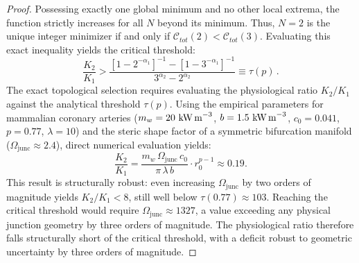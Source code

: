 \documentclass[11pt,a4paper]{article}
\theoremstyle{remark}
\begin{document}
\begin{proof}
Possessing exactly one global minimum and no other local extrema, the function
strictly increases for all $N$ beyond its minimum. Thus, $N=2$ is the unique
integer minimizer if and only if $\mathcal{C}_{tot}(2) < \mathcal{C}_{tot}(3)$.
Evaluating this exact inequality yields the critical threshold:
\[ \frac{K_2}{K_1} > \frac{ \left[ 1 - 2^{-\alpha_1} \right]^{-1} - \left[ 1 - 3^{-\alpha_1} \right]^{-1} }{ 3^{\alpha_2} - 2^{\alpha_2} } \equiv \tau(p) \,. \]
The exact topological selection requires evaluating the physiological
ratio $K_2/K_1$ against the analytical threshold $\tau(p)$. Using
the empirical parameters for mammalian coronary arteries
($m_w = 20~\text{kW\,m}^{-3}$, $b = 1.5~\text{kW\,m}^{-3}$,
$c_0 = 0.041$, $p = 0.77$, $\lambda = 10$) and the steric shape factor
of a symmetric bifurcation manifold ($\Omega_{\mathrm{junc}} \approx
2.4$), direct numerical evaluation yields:
\[
  \frac{K_2}{K_1}
  = \frac{m_w\,\Omega_{\mathrm{junc}}\,c_0}{\pi\,\lambda\,b}
    \cdot r_0^{p-1}
  \approx 0.19.
\]
This result is structurally robust: even increasing $\Omega_{\mathrm{junc}}$
by two orders of magnitude yields $K_2/K_1 < 8$, still well below
$\tau(0.77) \approx 103$. Reaching the critical threshold would require
$\Omega_{\mathrm{junc}} \approx 1327$, a value exceeding any physical
junction geometry by three orders of magnitude. The physiological ratio
therefore falls structurally short of the critical threshold,
with a deficit robust to geometric uncertainty by three orders of magnitude.
\end{proof}
\end{document}
